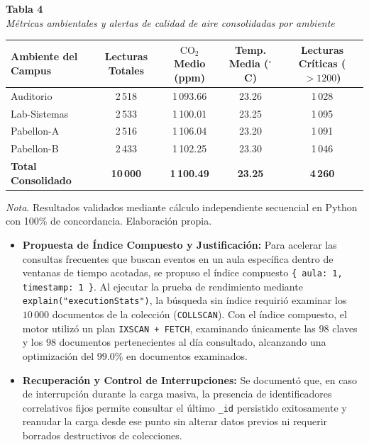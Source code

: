 \documentclass[12pt,a4paper]{article}
\begin{document}
\clearpage

\begin{center}
\small
\noindent\textbf{Tabla 4} \\
\textit{Métricas ambientales y alertas de calidad de aire consolidadas por ambiente}
\vspace{4pt}

\begin{tabular}{lcccc}
    \toprule
    \textbf{Ambiente del Campus} & \textbf{Lecturas Totales} & \textbf{$\text{CO}_2$ Medio (ppm)} & \textbf{Temp. Media ($^\circ$C)} & \textbf{Lecturas Críticas ($>1200$)} \\
    \midrule
    Auditorio & 2\,518 & 1\,093.66 & 23.26 & 1\,028 \\
    Lab-Sistemas & 2\,533 & 1\,100.01 & 23.25 & 1\,095 \\
    Pabellon-A & 2\,516 & 1\,106.04 & 23.20 & 1\,091 \\
    Pabellon-B & 2\,433 & 1\,102.25 & 23.30 & 1\,046 \\
    \midrule
    \textbf{Total Consolidado} & \textbf{10\,000} & \textbf{1\,100.49} & \textbf{23.25} & \textbf{4\,260} \\
    \bottomrule
\end{tabular}
\vspace{3pt}

\raggedright\footnotesize\textit{Nota}. Resultados validados mediante cálculo independiente secuencial en Python con 100\% de concordancia. Elaboración propia.
\end{center}

\begin{itemize}
    \item \textbf{Propuesta de Índice Compuesto y Justificación:}
    Para acelerar las consultas frecuentes que buscan eventos en un aula específica dentro de ventanas de tiempo acotadas, se propuso el índice compuesto \texttt{\{ aula: 1, timestamp: 1 \}}.
    Al ejecutar la prueba de rendimiento mediante \texttt{explain("executionStats")}, la búsqueda sin índice requirió examinar los $10\,000$ documentos de la colección (\texttt{COLLSCAN}). Con el índice compuesto, el motor utilizó un plan \texttt{IXSCAN + FETCH}, examinando únicamente las $98$ claves y los $98$ documentos pertenecientes al día consultado, alcanzando una optimización del $99.0\%$ en documentos examinados.
    \item \textbf{Recuperación y Control de Interrupciones:}
    Se documentó que, en caso de interrupción durante la carga masiva, la presencia de identificadores correlativos fijos permite consultar el último \texttt{\_id} persistido exitosamente y reanudar la carga desde ese punto sin alterar datos previos ni requerir borrados destructivos de colecciones.
\end{itemize}
\end{document}
